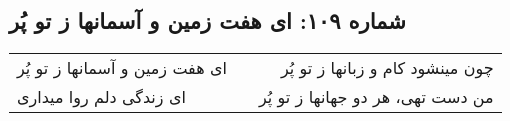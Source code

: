 \begin{center}
\section*{شماره ۱۰۹: ای هفت زمین و آسمانها ز تو پُر}
\label{sec:109}
\begin{longtable}{l p{0.5cm} r}
ای هفت زمین و آسمانها ز تو پُر
&&
چون مینشود کام و زبانها ز تو پُر
\\
ای زندگی دلم روا میداری
&&
من دست تهی، هر دو جهانها ز تو پُر
\\
\end{longtable}
\end{center}

